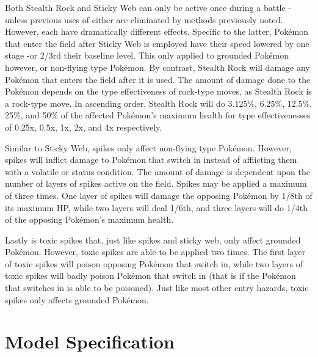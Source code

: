 \documentclass[12pt,twoside]{reedthesis}
\begin{document}
  Both Stealth Rock and Sticky Web can only be active once during a battle
  -unless previous uses of either are eliminated by methods previously
  noted. However, each have dramatically different effects. Specific to
  the latter, Pokémon that enter the field after Sticky Web is employed
  have their speed lowered by one stage -or 2/3rd their baseline level.
  This only applied to grounded Pokémon however, or non-flying type
  Pokémon. By contrast, Stealth Rock will damage any Pokémon that enters
  the field after it is used. The amount of damage done to the Pokémon
  depends on the type effectiveness of rock-type moves, as Stealth Rock is
  a rock-type move. In ascending order, Stealth Rock will do 3.125\%,
  6.25\%, 12.5\%, 25\%, and 50\% of the affected Pokémon's maximum health
  for type effectivenesses of 0.25x, 0.5x, 1x, 2x, and 4x respectively.
  
  Similar to Sticky Web, spikes only affect non-flying type Pokémon.
  However, spikes will inflict damage to Pokémon that switch in instead of
  afflicting them with a volatile or status condition. The amount of
  damage is dependent upon the number of layers of spikes active on the
  field. Spikes may be applied a maximum of three times. One layer of
  spikes will damage the opposing Pokémon by 1/8th of its maximum HP,
  while two layers will deal 1/6th, and three layers will do 1/4th of the
  opposing Pokémon's maximum health.
  
  Lastly is toxic spikes that, just like spikes and sticky web, only
  affect grounded Pokémon. However, toxic spikes are able to be applied
  two times. The first layer of toxic spikes will poison opposing Pokémon
  that switch in, while two layers of toxic spikes will badly poison
  Pokémon that switch in (that is if the Pokémon that switches in is able
  to be poisoned). Just like most other entry hazards, toxic spikes only
  affects grounded Pokémon.
  
  \section{Model Specification}\label{model-specification}
  
\end{document}
